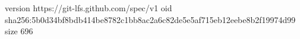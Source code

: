 version https://git-lfs.github.com/spec/v1
oid sha256:5b0d34bf8bdb414be8782c1bb8ac2a6c82de5e5af715eb12eebe8b2f19974d99
size 696
